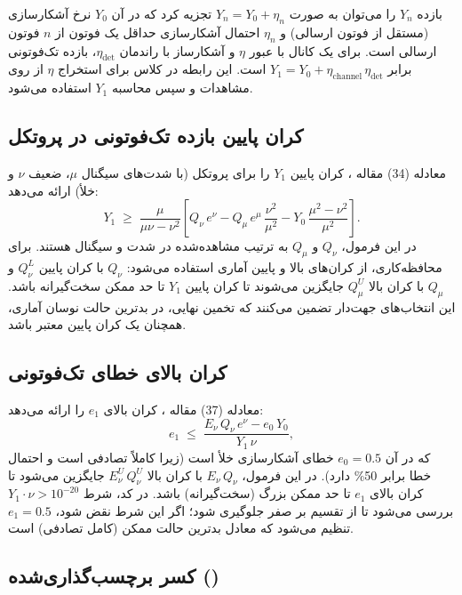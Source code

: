بازده $Y_n$ را می‌توان به صورت $Y_n = Y_0 + \eta_n$ تجزیه کرد که در آن $Y_0$ نرخ آشکارسازی  (مستقل از فوتون ارسالی) و $\eta_n$ احتمال آشکارسازی حداقل یک فوتون از $n$ فوتون ارسالی است. برای یک کانال با عبور $\eta$ و آشکارساز با راندمان $\eta_{\text{det}}$، بازده تک‌فوتونی برابر $Y_1 = Y_0 + \eta_{\text{channel}}\,\eta_{\text{det}}$ است. این رابطه در کلاس  برای استخراج $\eta$ از روی مشاهدات و سپس محاسبه $Y_1$ استفاده می‌شود.

\subsection{کران پایین بازده تک‌فوتونی در پروتکل }

معادله (34) مقاله ، کران پایین $Y_1$ را برای پروتکل  (با شدت‌های سیگنال $\mu$،  ضعیف $\nu$ و خلأ) ارائه می‌دهد:
\begin{equation}
	Y_1 \;\ge\; \frac{\mu}{\mu\nu - \nu^2}\left[Q_\nu\,e^{\nu} - Q_\mu\,e^{\mu}\,\frac{\nu^2}{\mu^2} - Y_0\,\frac{\mu^2 - \nu^2}{\mu^2}\right].
\end{equation}
در این فرمول، $Q_\nu$ و $Q_\mu$ به ترتیب  مشاهده‌شده در شدت  و سیگنال هستند. برای محافظه‌کاری، از کران‌های بالا و پایین آماری استفاده می‌شود: $Q_\nu$ با کران پایین $Q_\nu^L$ و $Q_\mu$ با کران بالا $Q_\mu^U$ جایگزین می‌شوند تا کران پایین $Y_1$ تا حد ممکن سخت‌گیرانه باشد. این انتخاب‌های جهت‌دار تضمین می‌کنند که تخمین نهایی، در بدترین حالت نوسان آماری، همچنان یک کران پایین معتبر باشد.

\subsection{کران بالای خطای تک‌فوتونی}

معادله (37) مقاله ، کران بالای $e_1$ را ارائه می‌دهد:
\begin{equation}
	e_1 \;\le\; \frac{E_\nu\,Q_\nu\,e^{\nu} - e_0\,Y_0}{Y_1\,\nu},
\end{equation}
که در آن $e_0 = 0.5$ خطای آشکارسازی خلأ است (زیرا  کاملاً تصادفی است و احتمال خطا برابر 50\% دارد). در این فرمول، $E_\nu\,Q_\nu$ با کران بالا $E_\nu^U\,Q_\nu^U$ جایگزین می‌شود تا کران بالای $e_1$ تا حد ممکن بزرگ (سخت‌گیرانه) باشد. در کد، شرط $Y_1 \cdot \nu > 10^{-20}$ بررسی می‌شود تا از تقسیم بر صفر جلوگیری شود؛ اگر این شرط نقض شود، $e_1 = 0.5$ تنظیم می‌شود که معادل بدترین حالت ممکن (کامل تصادفی) است.

\subsection{کسر برچسب‌گذاری‌شده ()}

